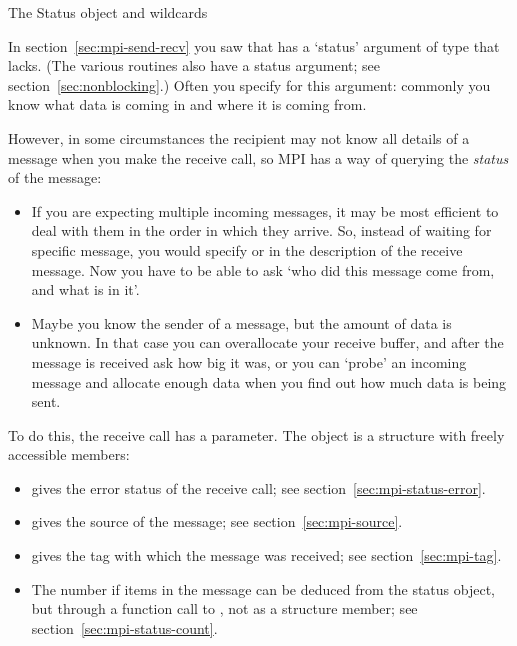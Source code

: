  {The Status object and wildcards}
\label{sec:mpi-wildcard}
\label{sec:mpi-status}

In section~\ref{sec:mpi-send-recv}
you saw that  has a `status' argument
of type  that  lacks.
(The various   routines also have a status
argument; see section~\ref{sec:nonblocking}.)
Often you specify 
for this argument: commonly you know
what data is coming in and where it is coming from.

However, in some circumstances the recipient may not know all details of a
message when you make the receive call, so MPI has a way of querying
the \emph{status} of the message:
\begin{itemize}
\item If you are expecting multiple incoming messages, it may be most
  efficient to deal with them in the order in which they arrive. So,
  instead of waiting for specific message, you would specify
   or  in
  the description of the receive message. 
  Now you have to be able to ask `who did this message come from,
  and what is in it'.
\item Maybe you know the sender of a message, but the amount of data
  is unknown. In that case you can overallocate your receive buffer,
  and after the message is received ask how big it was, or you can
  `probe' an incoming message and allocate enough data when you find
  out how much data is being sent.
\end{itemize}

To do this, the receive call has a  parameter.
The  object
is a structure with freely accessible members:
\begin{itemize}
\item {} gives the error status of the receive call;
  see section~\ref{sec:mpi-status-error}.
\item {} gives the source of the message;
  see section~\ref{sec:mpi-source}.
\item {} gives the tag with which the message was received;
  see section~\ref{sec:mpi-tag}.
\item The number if items in the message can be deduced from the status object,
  but through a function call to ,
  not as a structure member;
  see section~\ref{sec:mpi-status-count}.
\end{itemize}

